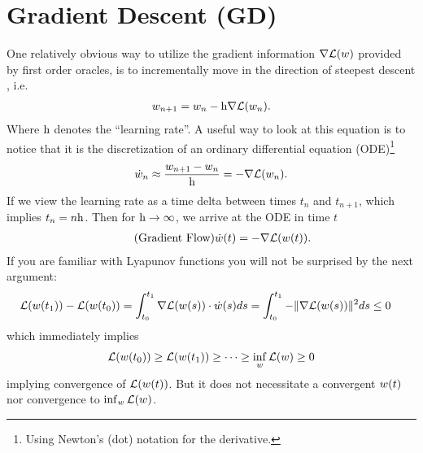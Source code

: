 
\chapter{Gradient Descent (GD)}\label{chap: gradient descent}

One relatively obvious way to utilize the gradient information
\(\nabla\mathcal{L}(w)\) provided by first order oracles, is to incrementally
move in the direction of steepest descent
\parencite{cauchyMethodeGeneralePour1847}, i.e.
%
\begin{align*}
	w_{n+1} = w_n - \text{h}\nabla \mathcal{L}(w_n).
\end{align*}
%
Where \(\text{h}\) denotes the ``learning rate''. A useful way to look at this
equation is to notice that it is the discretization of an ordinary differential
equation (ODE)\footnote{
	Using Newton's (dot) notation for the derivative.
}
%
\begin{align*}
	\dot{w}_n \approx \frac{w_{n+1} - w_n}{\text{h}}
	= - \nabla \mathcal{L}(w_n).
\end{align*}
%
If we view the learning rate as a time delta between times
\(t_n\) and \(t_{n+1}\), which implies \(t_n = n\text{h}\). Then for
\(\text{h}\to\infty\), we arrive at the ODE in time \(t\)
%
\begin{align}\label{eq: velocity is gradient}
	\tag{Gradient Flow}
	\dot{w}(t) = -\nabla \mathcal{L}(w(t)).
\end{align}
%
If you are familiar with Lyapunov functions you will not be surprised by the
next argument:
%
\begin{align}\label{eq: gradient integral}
	\mathcal{L}(w(t_1)) - \mathcal{L}(w(t_0))
	&= \int_{t_0}^{t_1} \nabla \mathcal{L}(w(s)) \cdot \dot{w}(s) ds
	= \int_{t_0}^{t_1} -\|\nabla \mathcal{L}(w(s))\|^2 ds
	\le 0
\end{align}
%
which immediately implies
%
\begin{align*}
	\mathcal{L}(w(t_0)) \ge \mathcal{L}(w(t_1)) \ge \dots \ge \inf_w \mathcal{L}(w) \ge 0
\end{align*}
implying convergence of \(\mathcal{L}(w(t))\). But it does not necessitate a
convergent \(w(t)\) nor convergence to \(\inf_w
\mathcal{L}(w)\).

